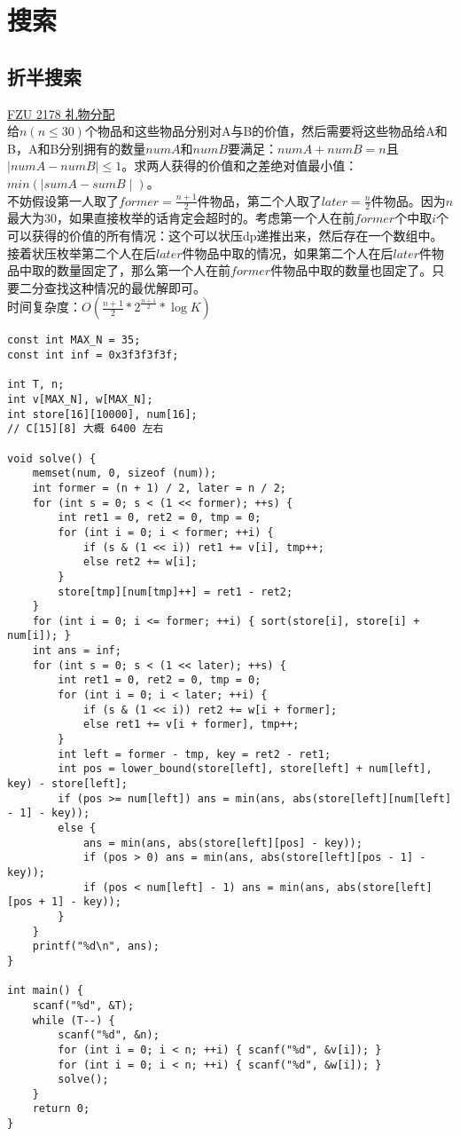 %
%

\chapter{搜索}
\section{折半搜索}
\underline {FZU 2178 礼物分配} \\
给$n(n\leq 30)$个物品和这些物品分别对A与B的价值，然后需要将这些物品给A和B，A和B分别拥有的数量$numA$和$numB$要满足：$numA+numB=n$且$\mid numA-numB\mid \leq 1$。求两人获得的价值和之差绝对值最小值：$min(\mid sumA-sumB\mid)$。 \\

不妨假设第一人取了$former=\frac{n+1}{2}$件物品，第二个人取了$later=\frac{n}{2}$件物品。因为$n$最大为30，如果直接枚举的话肯定会超时的。考虑第一个人在前$former$个中取$i$个可以获得的价值的所有情况：这个可以状压dp递推出来，然后存在一个数组中。接着状压枚举第二个人在后$later$件物品中取的情况，如果第二个人在后$later$件物品中取的数量固定了，那么第一个人在前$former$件物品中取的数量也固定了。只要二分查找这种情况的最优解即可。\\
时间复杂度：$O(\frac{n+1}{2}*2^{\frac{n+1}{2}}*\log K)$
\begin{lstlisting}
const int MAX_N = 35;
const int inf = 0x3f3f3f3f;

int T, n;
int v[MAX_N], w[MAX_N];
int store[16][10000], num[16];
// C[15][8] 大概 6400 左右

void solve() {
	memset(num, 0, sizeof (num));
	int former = (n + 1) / 2, later = n / 2;
	for (int s = 0; s < (1 << former); ++s) {
		int ret1 = 0, ret2 = 0, tmp = 0;
		for (int i = 0; i < former; ++i) {
			if (s & (1 << i)) ret1 += v[i], tmp++;
			else ret2 += w[i];
		}
		store[tmp][num[tmp]++] = ret1 - ret2;
	}
	for (int i = 0; i <= former; ++i) { sort(store[i], store[i] + num[i]); }
	int ans = inf;
	for (int s = 0; s < (1 << later); ++s) {
		int ret1 = 0, ret2 = 0, tmp = 0;
		for (int i = 0; i < later; ++i) {
			if (s & (1 << i)) ret2 += w[i + former];
			else ret1 += v[i + former], tmp++;
		}
		int left = former - tmp, key = ret2 - ret1;
		int pos = lower_bound(store[left], store[left] + num[left], key) - store[left];
		if (pos >= num[left]) ans = min(ans, abs(store[left][num[left] - 1] - key));
		else {
			ans = min(ans, abs(store[left][pos] - key));
			if (pos > 0) ans = min(ans, abs(store[left][pos - 1] - key));
			if (pos < num[left] - 1) ans = min(ans, abs(store[left][pos + 1] - key));
		}
	}
	printf("%d\n", ans);
}

int main() {
	scanf("%d", &T);
	while (T--) {
		scanf("%d", &n);
		for (int i = 0; i < n; ++i) { scanf("%d", &v[i]); }
		for (int i = 0; i < n; ++i) { scanf("%d", &w[i]); }
		solve();
	}
	return 0;
}
\end{lstlisting}

%
